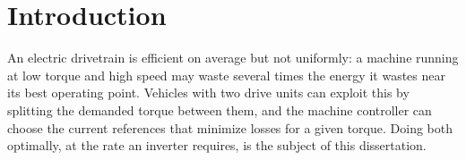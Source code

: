\chapter{Introduction}
\label{ch:introduction}

An electric drivetrain is efficient on average but not uniformly: a machine running at low
torque and high speed may waste several times the energy it wastes near its best operating
point. Vehicles with two drive units can exploit this by splitting the demanded torque between
them, and the machine controller can choose the current references that minimize losses for a
given torque. Doing both optimally, at the rate an inverter requires, is the subject of this
dissertation.
